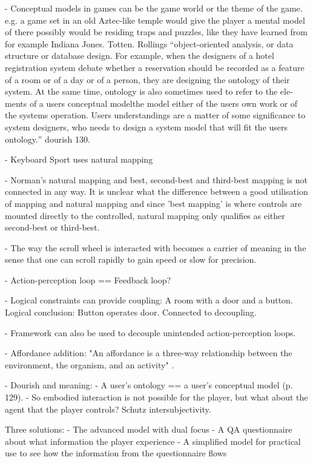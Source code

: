 - Conceptual models in games can be the game world or the theme of the game. e.g. a game set in an old Aztec-like temple would give the player a mental model of there possibly would be residing traps and puzzles, like they have learned from for example Indiana Jones. Totten. Rollings
``object-oriented analysis, or data structure or database design.
For example, when the designers of a hotel registration system debate
whether a reservation should be recorded as a feature of a room or of a
day or of a person, they are designing the ontology of their system. At
the same time, ontology is also sometimes used to refer to the ele-
ments of a users conceptual modelthe model either of the users own
work or of the systems operation. Users understandings are a matter of
some significance to system designers, who needs to design a system
model that will fit the users ontology.'' dourish 130.

- Keyboard Sport uses natural mapping

- Norman's natural mapping and best, second-best and third-best mapping is not connected in any way. It is unclear what the difference between a good utilisation of mapping and natural mapping and since 'best mapping' is where controls are mounted directly to the controlled, natural mapping only qualifies as either second-best or third-best.

- The way the scroll wheel is interacted with becomes a carrier of meaning in the sense that one can scroll rapidly to gain speed or slow for precision.

- Action-perception loop == Feedback loop?

- Logical constraints can provide coupling: A room with a door and a button. Logical conclusion: Button operates door. Connected to decoupling.

- Framework can also be used to decouple unintended action-perception loops.

 - Affordance addition: "An affordance is a three-way relationship between the environment, the organism, and an activity" \cite[p. 118]{dourish}.

 - Dourish and meaning:
  - A user's ontology == a user's conceptual model (p. 129).
  - So embodied interaction is not possible for the player, but what about the agent that the player controls? Schutz intersubjectivity.

Three solutions:
 - The advanced model with dual focus
 - A QA questionnaire about what information the player experience
 - A simplified model for practical use to see how the information from the questionnaire flows


